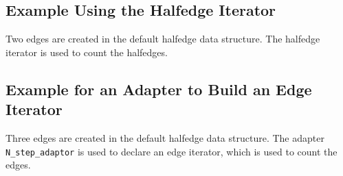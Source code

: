 \subsection{Example Using the Halfedge Iterator}

Two edges are created in the default halfedge data structure.
The halfedge iterator is used to count the halfedges.


\subsection{Example for an Adapter to Build an Edge Iterator}

Three edges are created in the default halfedge data structure.
The adapter {\tt N\_step\_adaptor} is used to declare an edge
iterator, which is used to count the edges.





